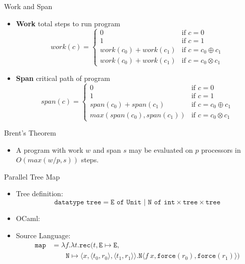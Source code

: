 \documentclass[pdf]{beamer}
\newcommand{\T}[1]{\texttt{#1}}
\newcommand{\LP}{\langle}
\newcommand{\RP}{\rangle}
\begin{document}
\begin{frame}{Work and Span}
  \begin{itemize}
    \item \textbf{Work} total steps to run program
      \begin{equation*}
        work(c) = \begin{cases}
          0 &\text{if } c = 0 \\
          1 &\text{if } c = 1 \\
          work(c_0) + work(c_1) &\text{if } c = c_0 \oplus c_1 \\
          work(c_0) + work(c_1) &\text{if } c = c_0 \otimes c_1
        \end{cases}
      \end{equation*}
    \item \textbf{Span} critical path of program
      \begin{equation*}
        span(c) = \begin{cases}
          0 &\text{if } c = 0 \\
          1 &\text{if } c = 1 \\
          span(c_0) + span(c_1) &\text{if } c = c_0 \oplus c_1 \\
          max(span(c_0), span(c_1)) &\text{if } c = c_0 \otimes c_1
        \end{cases}
      \end{equation*}
  \end{itemize}
\end{frame}

\begin{frame}{Brent's Theorem}
  \begin{itemize}
    \item A program with work $w$ and span $s$ may be evaluated on $p$
      processors in $O(max(w/p,s))$ steps.
  \end{itemize}
\end{frame}

\begin{frame}{Parallel Tree Map}
  \begin{itemize}
    \item Tree definition:
      \[ \T{datatype tree} = \T{E of Unit | N of int$\times$tree$\times$tree} \]
    \item OCaml:
      \lsttreemap

    \item Source Language:
      \begin{align*}
        \T{map} &= \lambda f.\lambda t.\T{rec}(t, \T{E} \mapsto \T{E}, \\
                &\qquad \T{N} \mapsto \LP x, \LP t_0, r_0 \RP, \LP t_1, r_1 \RP\RP.\T{N} \LP f\ x, \T{force}(r_0), \T{force}(r_1)\RP)
      \end{align*}
  \end{itemize}
\end{frame}
\end{document}
